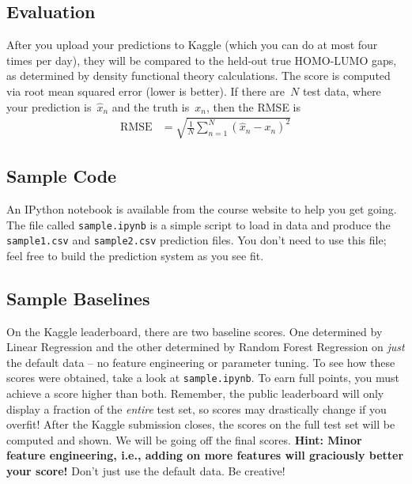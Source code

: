 \documentclass[12pt]{article}
\begin{document}
	\subsection*{Evaluation}
	After you upload your predictions to Kaggle (which you can do at most four times per day), they will be compared to the held-out true HOMO-LUMO gaps, as determined by density functional theory calculations.  The score is computed via root mean squared error (lower is better).  If there are~$N$ test data, where your prediction is~$\hat{x}_n$ and the truth is~$x_n$, then the RMSE is 
	\begin{align*}
		\text{RMSE} &= \sqrt{\frac{1}{N}\sum_{n=1}^N (\hat{x}_n-x_n)^2}
	\end{align*}
	
	\subsection*{Sample Code}
	An IPython notebook is available from the course website to help you get going.  The file called \verb|sample.ipynb| is a simple script to load in data and produce the \verb|sample1.csv| and \verb|sample2.csv| prediction files.  You don't need to use this file; feel free to build the prediction system as you see fit.
	
	\subsection*{Sample Baselines}
	On the Kaggle leaderboard, there are two baseline scores.  One determined by Linear Regression and the other determined by Random Forest Regression on \textit{just} the default data -- no feature engineering or parameter tuning.  To see how these scores were obtained, take a look at \verb|sample.ipynb|.  To earn full points, you must achieve a score higher than both.  Remember, the public leaderboard will only display a fraction of the \textit{entire} test set, so scores may drastically change if you overfit!  After the Kaggle submission closes, the scores on the full test set will be computed and shown.  We will be going off the final scores. 
	\textbf{Hint: Minor feature engineering, i.e., adding on more features will graciously better your score!}  Don't just use the default data.  Be creative!
	
\end{document}
